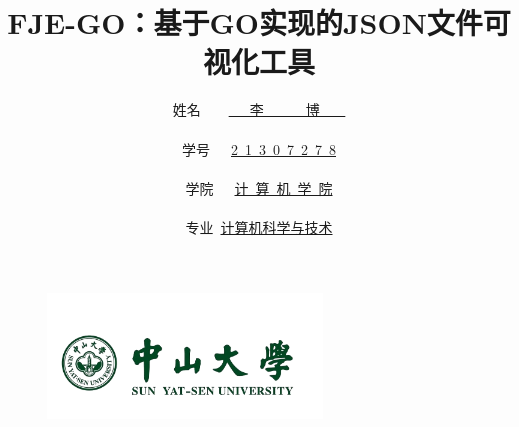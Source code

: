 \documentclass[hyperref,a4paper,UTF8]{ctexart}
\title{\vspace{3cm}\Huge\textbf{{ FJE-GO：基于GO实现的JSON文件可视化工具} \\ \LARGE{ }}\vspace{6cm}}
\author{
\kaishu\Large{姓名\ \ \ \ \underline{\  \ \ 李\ \ \ \ \ \ 博  \ \ \       }} \\\\
\kaishu\Large{学号\ \ \ \underline{2\ 1\ 3\ 0\ 7\ 2\ 7\ 8}} \\\\
\kaishu\Large{学院\ \ \ \underline{计\ 算\ 机\ 学\ 院}}\\\\
\kaishu\Large{专业\ \underline{计算机科学与技术}}
}
\date{} %
\begin{document}
\begin{figure}
    \centering
    \includegraphics[width=0.65\textwidth]{figures/sysu.png}
\end{figure}

\maketitle

\newpage


\tableofcontents 

\thispagestyle{empty} 
\newpage 























\end{document}
